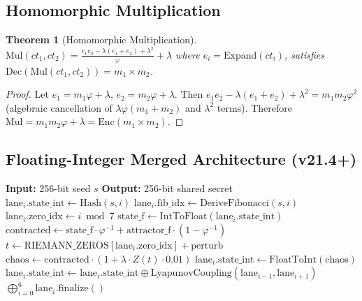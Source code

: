 \documentclass[11pt,a4paper]{article}
\newtheorem{theorem}{Theorem}[section]
\begin{document}
\subsection{Homomorphic Multiplication}

\begin{theorem}[Homomorphic Multiplication]
$\text{Mul}(ct_1, ct_2) = \frac{e_1 e_2 - \lambda(e_1 + e_2) + \lambda^2}{\varphi} + \lambda$ where $e_i = \text{Expand}(ct_i)$, satisfies $\text{Dec}(\text{Mul}(ct_1, ct_2)) = m_1 \times m_2$.
\end{theorem}
\begin{proof}
Let $e_1 = m_1\varphi + \lambda$, $e_2 = m_2\varphi + \lambda$. Then $e_1e_2 - \lambda(e_1+e_2) + \lambda^2 = m_1m_2\varphi^2$ (algebraic cancellation of $\lambda\varphi(m_1+m_2)$ and $\lambda^2$ terms). Therefore $\text{Mul} = m_1m_2\varphi + \lambda = \text{Enc}(m_1 \times m_2)$.
\end{proof}

\subsection{Floating-Integer Merged Architecture (v21.4+)}

\begin{algorithm}
\caption{7-Lane Lyapunov-Riemann Parallel KEM}
\label{alg:kem}
\begin{algorithmic}[1]
\State \textbf{Input:} 256-bit seed $s$
\State \textbf{Output:} 256-bit shared secret
 
\State $\text{lane}_i.\text{state\_int} \gets \text{Hash}(s, i)$ 
\State $\text{lane}_i.\text{fib\_idx} \gets \text{DeriveFibonacci}(s, i)$
\State $\text{lane}_i.\text{zero\_idx} \gets i \bmod 7$ 
\EndFor
{} 
\State $\text{state\_f} \gets \text{IntToFloat}(\text{lane}_i.\text{state\_int})$ 
\State $\text{contracted} \gets \text{state\_f} \cdot \varphi^{-1} + \text{attractor\_f} \cdot (1 - \varphi^{-1})$
\State $t \gets \text{RIEMANN\_ZEROS}[\text{lane}_i.\text{zero\_idx}] + \text{perturb}$
\State $\text{chaos} \gets \text{contracted} \cdot (1 + \lambda \cdot Z(t) \cdot 0.01)$
\State $\text{lane}_i.\text{state\_int} \gets \text{FloatToInt}(\text{chaos})$ 
\State $\text{lane}_i.\text{state\_int} \gets \text{lane}_i.\text{state\_int} \oplus \text{LyapunovCoupling}(\text{lane}_{i-1}, \text{lane}_{i+1})$
\EndFor
\EndFor
\State \Return $\bigoplus_{i=0}^{6} \text{lane}_i.\text{finalize}()$ 
\end{algorithmic}
\end{algorithm}
\end{document}
